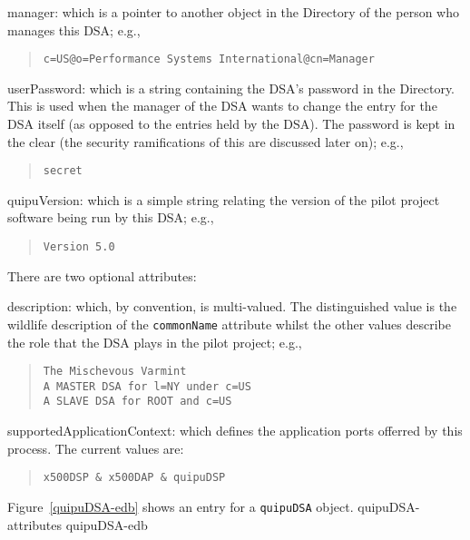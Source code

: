 \begin{describe}
\item[manager:]
			which is a pointer to another object in the Directory
			of the person who manages this DSA;
			e.g.,
\begin{quote}\small\begin{verbatim}
c=US@o=Performance Systems International@cn=Manager
\end{verbatim}\end{quote}

\item[userPassword:]
			which is a string containing the DSA's
			password in the Directory.  This is used
			when the manager of the DSA wants to
			change the entry for the DSA itself
			(as opposed to the entries held by the DSA).
			The password is kept in the clear
			(the security ramifications of this are
			discussed later on); e.g.,
\begin{quote}\small\begin{verbatim}
secret
\end{verbatim}\end{quote}

\item[quipuVersion:]
			which is a simple string relating the version of
			the pilot project software being run by this DSA;
			e.g.,
\begin{quote}\small\begin{verbatim}
Version 5.0
\end{verbatim}\end{quote}
\end{describe}
There are two optional attributes:
\begin{describe}
\item[description:]
			which, by convention, is multi-valued.
			The distinguished value is the wildlife description
			of the \verb"commonName" attribute whilst the other
			values describe the role that the DSA plays in
			the pilot project;
			e.g.,
\begin{quote}\small\begin{verbatim}
The Mischevous Varmint
A MASTER DSA for l=NY under c=US
A SLAVE DSA for ROOT and c=US
\end{verbatim}\end{quote}

\item[supportedApplicationContext:]
			which defines the application ports offerred by this
process.
			The current values are:
\begin{quote}\small\begin{verbatim}
x500DSP & x500DAP & quipuDSP
\end{verbatim}\end{quote}
\end{describe}
Figure~\ref{quipuDSA-edb} shows an entry for a \verb"quipuDSA" object.
%
	{quipuDSA-attributes}
%
	{quipuDSA-edb}

